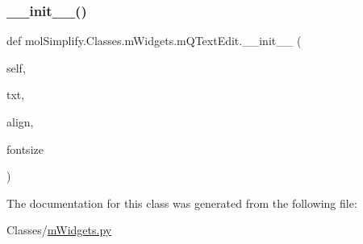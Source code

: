 \subsubsection{\texorpdfstring{\+\_\+\+\_\+init\+\_\+\+\_\+()}{\_\_init\_\_()}}
{\footnotesize\ttfamily def mol\+Simplify.\+Classes.\+m\+Widgets.\+m\+Q\+Text\+Edit.\+\_\+\+\_\+init\+\_\+\+\_\+ (\begin{DoxyParamCaption}\item[{}]{self,  }\item[{}]{txt,  }\item[{}]{align,  }\item[{}]{fontsize }\end{DoxyParamCaption})}



The documentation for this class was generated from the following file\+:\begin{DoxyCompactItemize}
\item 
Classes/\hyperlink{mWidgets_8py}{m\+Widgets.\+py}\end{DoxyCompactItemize}
